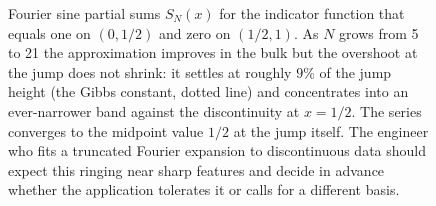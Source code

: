 \begin{figure}[htbp]
\caption[Gibbs phenomenon at a jump discontinuity]{Fourier sine
partial sums $S_N(x)$ for the indicator function that equals one on
$(0,1/2)$ and zero on $(1/2,1)$. As $N$ grows from 5 to 21 the
approximation improves in the bulk but the overshoot at the jump
does not shrink: it settles at roughly $9\%$ of the jump height (the
Gibbs constant, dotted line) and concentrates into an ever-narrower
band against the discontinuity at $x = 1/2$. The series converges to
the midpoint value $1/2$ at the jump itself. The engineer who fits a
truncated Fourier expansion to discontinuous data should expect this
ringing near sharp features and decide in advance whether the
application tolerates it or calls for a different basis.}
\label{fig:vol02:ch12:gibbs}
\end{figure}
